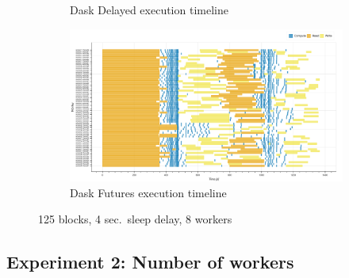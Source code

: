 \documentclass[conference]{IEEEtran}
\begin{document}
\begin{figure}[!htb]
\begin{subfigure}[b]{\columnwidth}
        \caption{Dask Delayed execution timeline}\label{fig:inc_dask_delayed_gantt}
    \end{subfigure}
    \hfill
    \begin{subfigure}[b]{\columnwidth}
        \includegraphics[clip,width=\columnwidth]{images/Dask_futures_inc_baseline_gantt.png}%
        \caption{Dask Futures execution timeline}\label{fig:inc_dask_futures_gantt}
    \end{subfigure}
    \caption{125 blocks, 4 sec.\ sleep delay, 8 workers}\label{fig:inc_gantt}
\end{figure}


\subsection{Experiment 2: Number of workers}
\end{document}
